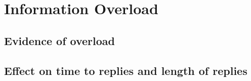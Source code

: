 \section{Information Overload}\label{section:overload}

\subsection{Evidence of overload}


\subsection{Effect on time to replies and length of replies}